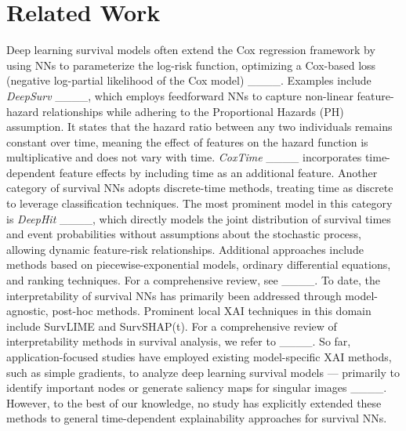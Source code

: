 \section{Related Work}
Deep learning survival models often extend the Cox regression framework by using NNs to parameterize the log-risk function, optimizing a Cox-based loss (negative log-partial likelihood of the Cox model) ____. Examples include \emph{DeepSurv} ____, which employs feedforward NNs to capture non-linear feature-hazard relationships while adhering to the Proportional Hazards (PH) assumption. It states that the hazard ratio between any two individuals remains constant over time, meaning the effect of features on the hazard function is multiplicative and does not vary with time. \emph{CoxTime} ____ incorporates time-dependent feature effects by including time as an additional feature. Another category of survival NNs adopts discrete-time methods, treating time as discrete to leverage classification techniques. The most prominent model in this category is \emph{DeepHit} ____, which directly models the joint distribution of survival times and event probabilities without assumptions about the stochastic process, allowing dynamic feature-risk relationships. Additional approaches include methods based on piecewise-exponential models, ordinary differential equations, and ranking techniques. For a comprehensive review, see ____. To date, the interpretability of survival NNs has primarily been addressed through model-agnostic, post-hoc methods. Prominent local XAI techniques in this domain include SurvLIME and SurvSHAP(t). For a comprehensive review of interpretability methods in survival analysis, we refer to ____. So far, application-focused studies have employed existing model-specific XAI methods, such as simple gradients, to analyze deep learning survival models — primarily to identify important nodes or generate saliency maps for singular images ____. However, to the best of our knowledge, no study has explicitly extended these methods to general time-dependent explainability approaches for survival NNs.